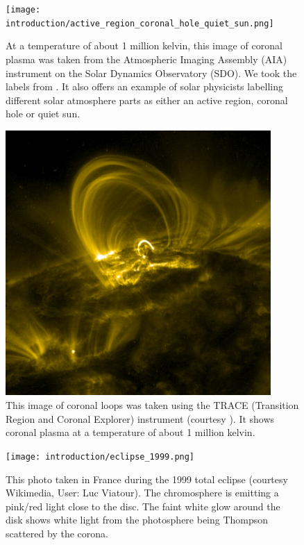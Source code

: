 \begin{figure}[!htp]
    \centering
    \texttt{[image: introduction/active\_region\_coronal\_hole\_quiet\_sun.png]}
    \caption{At a temperature of about 1 million kelvin, this image of coronal plasma was taken from the Atmospheric Imaging Assembly (AIA) instrument on the Solar Dynamics Observatory (SDO). We took the labels from \citet{Cargill2011}. It also offers an example of solar physicists labelling different solar atmosphere parts as either an active region, coronal hole or quiet sun.}
    \label{fig:active_region_quiet_sun_coronal_hole}
\end{figure}

\begin{figure}[!htp]
    \centering
    \includegraphics[width=0.9\textwidth]{figures/introduction/coronal_loop_trace.jpg}
    \caption{This image of coronal loops was taken using the TRACE (Transition Region and Coronal Explorer) instrument (courtesy \citet{images_of_coronal_loops}). It shows coronal plasma at a temperature of about 1 million kelvin.}
    \label{fig:coronal_loops_trace}
\end{figure}


\begin{figure}[!htp]
    \centering
    \texttt{[image: introduction/eclipse\_1999.png]}
    \caption{This photo taken in France during the 1999 total eclipse (courtesy Wikimedia, User: Luc Viatour). The chromosphere is emitting a pink/red light close to the disc. The faint white glow around the disk shows white light from the photosphere being Thompson scattered by the corona.}
    \label{fig:total_eclipse1999}
\end{figure}

